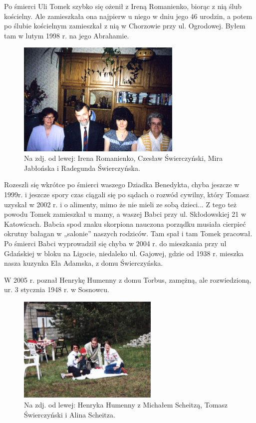 Po śmierci Uli Tomek szybko się ożenił z Ireną Romanienko, biorąc z nią ślub kościelny. Ale zamieszkała ona najpierw u niego w dniu jego 46 urodzin, a potem po ślubie kościelnym zamieszkał z nią w Chorzowie przy ul. Ogrodowej. Byłem tam w lutym 1998 r. na jego Abrahamie. 
\begin{figure}[!h]
\begin{center}
\includegraphics[width=0.7\textwidth]{photo/irena_romanienko.jpg}
\caption[Irena Romanienko]{Na zdj. od lewej: Irena Romanienko, Czesław Świerczyński, Mira Jabłońska i Radegunda Świerczyńska.}
\end{center}
\end{figure}

Rozeszli się wkrótce po śmierci waszego Dziadka Benedykta, chyba jeszcze w 1999r. i jeszcze spory czas ciągali się po sądach o rozwód cywilny, który Tomasz uzyskał w 2002 r. i o alimenty, mimo że nie mieli ze sobą dzieci... Z tego też powodu Tomek zamieszkał u mamy, a waszej Babci przy ul. Skłodowskiej 21 w Katowicach. Babcia spod znaku skorpiona nauczona porządku musiała cierpieć okrutny bałagan w „salonie” naszych rodziców. Tam spał i tam Tomek pracował. Po śmierci Babci wyprowadził się chyba w 2004 r. do mieszkania przy ul Gdańskiej w bloku na Ligocie, niedaleko ul. Gajowej, gdzie od 1938 r. mieszka nasza kuzynka Ela Adamska, z domu Świerczyńska. 

W 2005 r. poznał Henrykę Humenny z domu Torbus, zamężną, ale rozwiedzioną, ur. 3 stycznia 1948 r. w Sosnowcu.
\begin{figure}[!h]
\begin{center}
\includegraphics[width=0.6\textwidth]{photo/henryka_humenny_1.jpg}
\caption[Henryka Humenny]{Na zdj. od lewej: Henryka Humenny z Michałem Scheitzą, Tomasz Świerczyński i Alina Scheitza.}
\end{center}
\end{figure}

